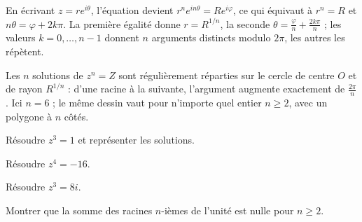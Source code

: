 \begin{demonstration}
En écrivant $z = re^{i\theta}$, l'équation devient $r^{n}e^{in\theta}
= Re^{i\varphi}$, ce qui équivaut à $r^{n} = R$ et
$n\theta = \varphi+2k\pi$. La première égalité donne $r = R^{1/n}$, la seconde
$\theta = \frac{\varphi}{n}+\frac{2k\pi}{n}$ ; les valeurs $k = 0,\dots,n-1$
donnent $n$ arguments distincts modulo $2\pi$, les autres les répètent.
\end{demonstration}

\begin{visualisation}
\begin{center}
\end{center}
Les $n$ solutions de $z^{n}=Z$ sont régulièrement réparties sur le cercle de
centre $O$ et de rayon $R^{1/n}$ : d'une racine à la suivante, l'argument
augmente exactement de $\frac{2\pi}{n}$. Ici $n=6$ ; le même dessin vaut pour
n'importe quel entier $n \geq 2$, avec un polygone à $n$ côtés.
\end{visualisation}

\begin{entrainement}
\exo[\niveau{1}] Résoudre $z^{3} = 1$ et représenter les solutions.

\exo[\niveau{2}] Résoudre $z^{4} = -16$.

\exo[\niveau{2}] Résoudre $z^{3} = 8i$.

\exo[\niveau{3}] Montrer que la somme des racines $n$-ièmes de l'unité est
nulle pour $n \geq 2$.
\end{entrainement}

